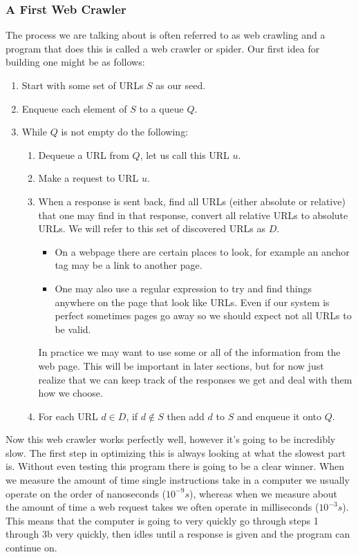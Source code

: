 \documentclass{article}
\begin{document}
	\subsubsection{A First Web Crawler}
	The process we are talking about is often referred to as web crawling and a program that does this is called a web crawler or spider. Our first idea for building one might be as follows:
	\begin{enumerate}
		\item Start with some set of URLs $S$ as our seed.
		\item Enqueue each element of $S$ to a queue $Q$.
		\item While $Q$ is not empty do the following:
		\begin{enumerate}
			\item Dequeue a URL from $Q$, let us call this URL $u$.
			\item Make a request to URL $u$.
			\item When a response is sent back, find all URLs (either absolute or relative) that one may find in that response, convert all relative URLs to absolute URLs. We will refer to this set of discovered URLs as $D$.
			\begin{itemize}
				\item On a webpage there are certain places to look, for example an anchor tag may be a link to another page.
				\item One may also use a regular expression to try and find things anywhere on the page that look like URLs. Even if our system is perfect sometimes pages go away so we should expect not all URLs to be valid.
			\end{itemize}
			In practice we may want to use some or all of the information from the web page. This will be important in later sections, but for now just realize that we can keep track of the responses we get and deal with them how we choose.
			\item For each URL $d\in D$, if $d \not\in S$ then add $d$ to $S$ and enqueue it onto $Q$.
		\end{enumerate}
	\end{enumerate}
	
	Now this web crawler works perfectly well, however it's going to be incredibly slow. The first step in optimizing this is always looking at what the slowest part is. Without even testing this program there is going to be a clear winner. When we measure the amount of time single instructions take in a computer we usually operate on the order of nanoseconds ($10^{-9} s$), whereas when we measure about the amount of time a web request takes we often operate in milliseconds ($10^{-3} s$). This means that the computer is going to very quickly go through steps 1 through 3b very quickly, then idles until a response is given and the program can continue on.
	
\end{document}

